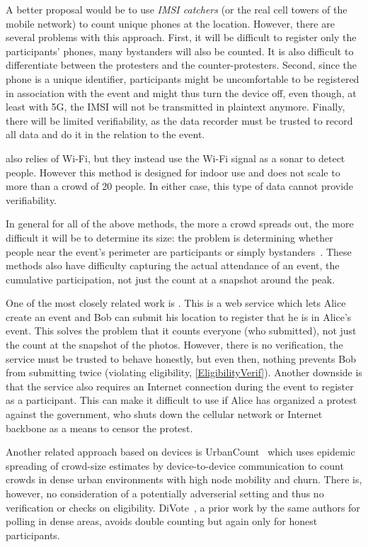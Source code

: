 A better proposal would be to use \emph{IMSI catchers} (or the real cell 
towers of the mobile network) to count unique phones at the location.
However, there are several problems with this approach.
First, it will be difficult to register only the participants' phones, many 
bystanders will also be counted.
It is also difficult to differentiate between the protesters and the 
counter-protesters.
Second, since the phone is a unique identifier, participants might be 
uncomfortable to be registered in association with the event and might thus 
turn the device off, even though, at least with 5G, the IMSI will not be
transmitted in plaintext anymore. %
Finally, there will be limited verifiability, as the data recorder must be 
trusted to record all data and do it in the relation to the event.

 also relies of Wi-Fi, but they instead use the Wi-Fi 
signal as a sonar to detect people.
However this method is designed for indoor use and does not scale to more than 
a crowd of 20 people.
In either case, this type of data cannot provide verifiability.

In general for all of the above methods, the more a crowd spreads out, the more
difficult it will be to determine its size:
the problem is determining whether people near the event's perimeter are 
participants or simply bystanders~\cite{HowToEstimateCrowdSize}.
These methods also have difficulty capturing the actual attendance of an event,
\ie the cumulative participation, not just the count at a snapshot around the 
peak.

One of the most closely related work is \citet{CrowdCount}.
This is a web service which lets Alice create an event and Bob can submit his 
location to register that he is in Alice's event.
This solves the problem that it counts everyone (who submitted), not just the 
count at the snapshot of the photos.
However, there is no verification, \ie the service must be trusted to behave 
honestly, but even then, nothing prevents Bob from submitting twice (violating 
eligibility, \cref{EligibilityVerif}).
Another downside is that the service also requires an Internet connection 
during the event to register as a participant.
This can make it difficult to use if \eg Alice has organized a protest 
against the government, who shuts down the cellular network or Internet 
backbone as a means to censor the protest.

Another related approach based on devices is UrbanCount~\cite{UrbanCount} which
uses epidemic spreading of crowd-size estimates by device-to-device
communication to count crowds in dense urban environments with high
node mobility and churn. There is, however, no consideration of a potentially
adverserial setting and thus no verification or checks on
eligibility. DiVote~\cite{DiVote}, a prior work by the same authors for
polling in dense areas, avoids double counting but again only for
honest participants.

